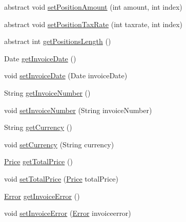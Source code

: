 \begin{DoxyCompactItemize}
\item 
abstract void \hyperlink{class_reduced_invoice_1_1_a_invoice_aef6af27bf12024c16e8e5890243825eb}{set\+Position\+Amount} (int amount, int index)
\item 
abstract void \hyperlink{class_reduced_invoice_1_1_a_invoice_a5919a1c5d917fc62d654441f582f470e}{set\+Position\+Tax\+Rate} (int taxrate, int index)
\item 
abstract int \hyperlink{class_reduced_invoice_1_1_a_invoice_a109ff7a484de183356ebe38737556f11}{get\+Positions\+Length} ()
\item 
Date \hyperlink{class_reduced_invoice_1_1_a_invoice_ac78ce56c3ae003ca87e8144546d7ec3f}{get\+Invoice\+Date} ()
\item 
void \hyperlink{class_reduced_invoice_1_1_a_invoice_adefa18f4aec87c1d4b89233baf6ce9ee}{set\+Invoice\+Date} (Date invoice\+Date)
\item 
String \hyperlink{class_reduced_invoice_1_1_a_invoice_a09231d505794762ea8f363e4689392c8}{get\+Invoice\+Number} ()
\item 
void \hyperlink{class_reduced_invoice_1_1_a_invoice_a20d784a1da556e7bb3c5538c5a6701c4}{set\+Invoice\+Number} (String invoice\+Number)
\item 
String \hyperlink{class_reduced_invoice_1_1_a_invoice_a2c0175f8fdd6c21504bdf6f8e3336cc2}{get\+Currency} ()
\item 
void \hyperlink{class_reduced_invoice_1_1_a_invoice_a83a6ba629194d28ea32c24275d0e14ba}{set\+Currency} (String currency)
\item 
\hyperlink{class_reduced_invoice_1_1_price}{Price} \hyperlink{class_reduced_invoice_1_1_a_invoice_aedc84169ce345d6f7c72b808c305c27b}{get\+Total\+Price} ()
\item 
void \hyperlink{class_reduced_invoice_1_1_a_invoice_ac5c395d78cb3bd54e8e40678bdb46bf0}{set\+Total\+Price} (\hyperlink{class_reduced_invoice_1_1_price}{Price} total\+Price)
\item 
\hyperlink{enum_reduced_invoice_1_1_a_invoice_1_1_error}{Error} \hyperlink{class_reduced_invoice_1_1_a_invoice_ac6335f5b80ba3514a205e46c7170ae5c}{get\+Invoice\+Error} ()
\item 
void \hyperlink{class_reduced_invoice_1_1_a_invoice_a625c87b0ecdcbf896e66e4ad1fe31681}{set\+Invoice\+Error} (\hyperlink{enum_reduced_invoice_1_1_a_invoice_1_1_error}{Error} invoiceerror)
\end{DoxyCompactItemize}
